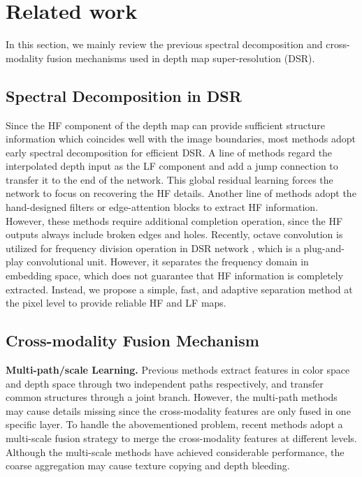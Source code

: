 \documentclass[letterpaper]{article} %
\begin{document}
\section{Related work}
In this section, we mainly review the previous spectral decomposition and cross-modality fusion mechanisms used in depth map super-resolution (DSR).

\subsection{Spectral Decomposition in DSR}
Since the HF component of the depth map can provide sufficient structure information which coincides well with the image boundaries, most methods adopt early spectral decomposition for efficient DSR. A line of methods \cite{makarov2017semi,xiao2018joint,li2019joint,zuo2019multi,2019Hierarchical} regard the interpolated depth input as the LF component and add a jump connection to transfer it to the end of the network. This global residual learning forces the network to focus on recovering the HF details. Another line of methods adopt the hand-designed filters \cite{2016Multi,yang2017depth} or edge-attention \cite{ye2018depthF,chen2018single} blocks to extract HF information. However, these methods require additional completion operation, since the HF outputs always include broken edges and holes. Recently, octave convolution \cite{chen2019drop} is utilized for frequency division operation in DSR network \cite{he2021towards}, which is a plug-and-play convolutional unit. However, it separates the frequency domain in embedding space, which does not guarantee that HF information is completely extracted. Instead, we propose a simple, fast, and adaptive separation method at the pixel level to provide reliable HF and LF maps.

\subsection{Cross-modality Fusion Mechanism}

\textbf{Multi-path/scale Learning.}
Previous methods \cite{li2016deep,lutio2019guided,zhu2018co,chen2018single,hao2019multi,su2019pixel} extract features in color space and depth space through two independent paths respectively, and transfer common structures through a joint branch. However, the multi-path methods may cause details missing since the cross-modality features are only fused in one specific layer. To handle the abovementioned problem, recent methods \cite{2016Multi,2019Hierarchical,he2021towards,zuo2019multi,zuo2019residual,yan2022learning} adopt a multi-scale fusion strategy to merge the cross-modality features at different levels. Although the multi-scale methods have achieved considerable performance, the coarse aggregation may cause texture copying and depth bleeding.
\end{document}
